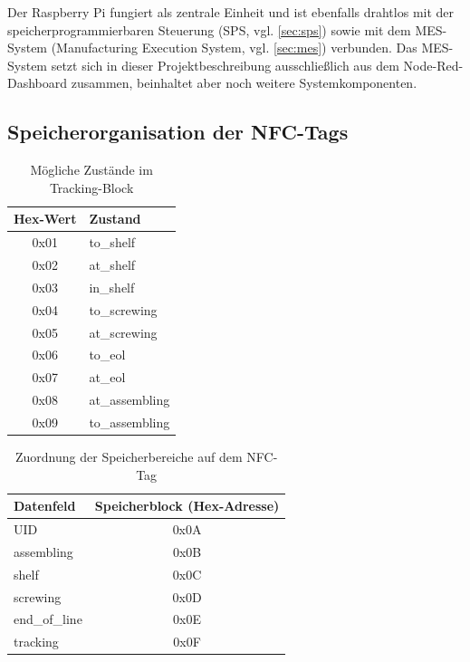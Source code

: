 Der Raspberry Pi fungiert als zentrale Einheit und ist ebenfalls drahtlos mit der speicherprogrammierbaren Steuerung (SPS, vgl. \autoref{sec:sps}) sowie mit dem MES-System (Manufacturing Execution System, vgl. \autoref{sec:mes}) verbunden. Das MES-System setzt sich in dieser Projektbeschreibung ausschließlich aus dem Node-Red-Dashboard zusammen, beinhaltet aber noch weitere Systemkomponenten. 

\subsection{Speicherorganisation der NFC-Tags}

\begin{table}[H]
	\centering
	\caption{Mögliche Zustände im Tracking-Block}
	\label{tab:tracking_states}
	\begin{tabular}{|c|l|}
		\hline
		\textbf{Hex-Wert} & \textbf{Zustand} \\ \hline
		0x01 & to\_shelf \\ \hline
		0x02 & at\_shelf \\ \hline
		0x03 & in\_shelf \\ \hline
		0x04 & to\_screwing \\ \hline
		0x05 & at\_screwing \\ \hline
		0x06 & to\_eol \\ \hline
		0x07 & at\_eol \\ \hline
		0x08 & at\_assembling \\ \hline
		0x09 & to\_assembling \\ \hline
	\end{tabular}
\end{table}


\begin{table}[H]
	\centering
	\caption{Zuordnung der Speicherbereiche auf dem NFC-Tag}
	\label{tab:tag_blocks}
	\begin{tabular}{|l|c|}
		\hline
		\textbf{Datenfeld} & \textbf{Speicherblock (Hex-Adresse)} \\ \hline
		UID & 0x0A \\ \hline
		assembling & 0x0B \\ \hline
		shelf & 0x0C \\ \hline
		screwing & 0x0D \\ \hline
		end\_of\_line & 0x0E \\ \hline
		tracking & 0x0F \\ \hline
	\end{tabular}
\end{table}


